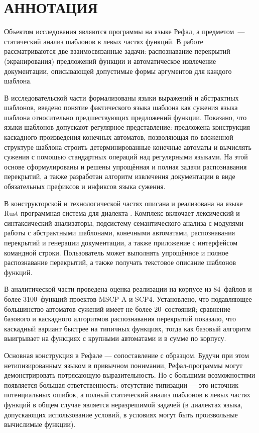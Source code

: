 \section*{АННОТАЦИЯ} %

Объектом исследования являются программы на языке Рефал, а предметом~--- статический анализ шаблонов в левых частях функций.
В работе рассматриваются две взаимосвязанные задачи: распознавание перекрытий (экранирования) предложений функции и автоматическое извлечение документации, описывающей допустимые формы аргументов для каждого шаблона.

В исследовательской части формализованы языки выражений и абстрактных шаблонов, введено понятие фактического языка шаблона как сужения языка шаблона относительно предшествующих предложений функции.
Показано, что языки шаблонов допускают регулярное представление: предложена конструкция каскадного произведения конечных автоматов, позволяющая по вложенной структуре шаблона строить детерминированные конечные автоматы и вычислять сужения с помощью стандартных операций над регулярными языками.
На этой основе сформулированы и решены упрощённая и полная задачи распознавания перекрытий, а также разработан алгоритм извлечения документации в виде обязательных префиксов и инфиксов языка сужения.

В конструкторской и технологической частях описана и реализована на языке Rust программная система для диалекта \RL.
Комплекс включает лексический и синтаксический анализаторы, подсистему семантического анализа с модулями работы с абстрактными шаблонами, конечными автоматами, распознавания перекрытий и генерации документации, а также приложение с интерфейсом командной строки.
Пользователь может выполнять упрощённое и полное распознавание перекрытий, а также получать текстовое описание шаблонов функций.

В аналитической части проведена оценка реализации на корпусе из 84~файлов и более 3100~функций проектов MSCP-A и SCP4.
Установлено, что подавляющее большинство автоматов сужений имеет не более 20~состояний; сравнение базового и каскадного алгоритмов распознавания перекрытий показало, что каскадный вариант быстрее на типичных  функциях, тогда как базовый алгоритм выигрывает на функциях с крупными автоматами и в сумме по корпусу.

Основная конструкция в Рефале --- сопоставление с образцом. Будучи при этом
нетипизированным языком в привычном понимании, Рефал-программы могут демонстрировать
потрясающую выразительность. Но с большими возможностями появляется большая ответственность:
отсутствие типизации --- это источник потенциальных ошибок, а
полный статический анализ шаблонов в левых частях функций в общем случае 
является неразрешимой задачей (в диалектах языка, допускающих 
использование условий, в условиях могут быть произвольные вычислимые функции).

